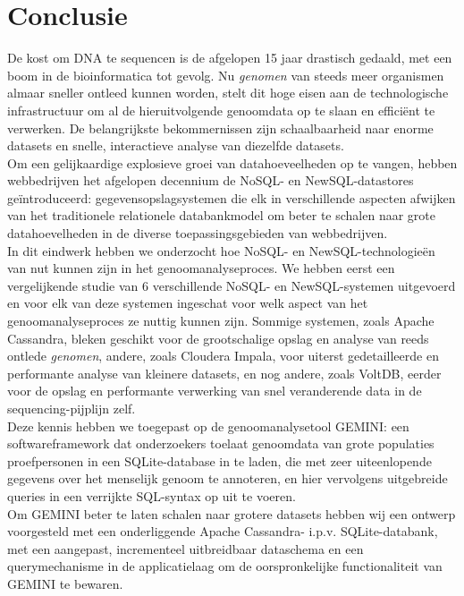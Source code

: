 \chapter{Conclusie}

De kost om DNA te sequencen is de afgelopen 15 jaar drastisch gedaald, met een boom in de bioinformatica tot gevolg. Nu \emph{genomen} van steeds meer organismen almaar sneller ontleed kunnen worden, stelt dit hoge eisen aan de technologische infrastructuur om al de hieruitvolgende genoomdata op te slaan en effici\"ent te verwerken. De belangrijkste bekommernissen zijn schaalbaarheid naar enorme datasets en snelle, interactieve analyse van diezelfde datasets.\\
Om een gelijkaardige explosieve groei van datahoeveelheden op te vangen, hebben webbedrijven het afgelopen decennium de NoSQL- en NewSQL-datastores ge\"introduceerd: gegevensopslagsystemen die elk in verschillende aspecten afwijken van het traditionele relationele databankmodel om beter te schalen naar grote datahoevelheden in de diverse toepassingsgebieden van webbedrijven.\\
In dit eindwerk hebben we onderzocht hoe NoSQL- en NewSQL-technologie\"en van nut kunnen zijn in het genoomanalyseproces. We hebben eerst een vergelijkende studie van 6 verschillende NoSQL- en NewSQL-systemen uitgevoerd en voor elk van deze systemen ingeschat voor welk aspect van het genoomanalyseproces ze nuttig kunnen zijn. Sommige systemen, zoals Apache Cassandra, bleken geschikt voor de grootschalige opslag en analyse van reeds ontlede \emph{genomen}, andere, zoals Cloudera Impala, voor uiterst gedetailleerde en performante analyse van kleinere datasets, en nog andere, zoals VoltDB, eerder voor de opslag en performante verwerking van snel veranderende data in de sequencing-pijplijn zelf.\\
Deze kennis hebben we toegepast op de genoomanalysetool GEMINI: een softwareframework dat onderzoekers toelaat genoomdata van grote populaties proefpersonen in een SQLite-database in te laden, die met zeer uiteenlopende gegevens over het menselijk genoom te annoteren, en hier vervolgens uitgebreide queries in een verrijkte SQL-syntax op uit te voeren.\\
Om GEMINI beter te laten schalen naar grotere datasets hebben wij een ontwerp voorgesteld met een onderliggende Apache Cassandra- i.p.v. SQLite-databank, met een aangepast, incrementeel uitbreidbaar dataschema en een querymechanisme in de applicatielaag om de oorspronkelijke functionaliteit van GEMINI te bewaren.\\
